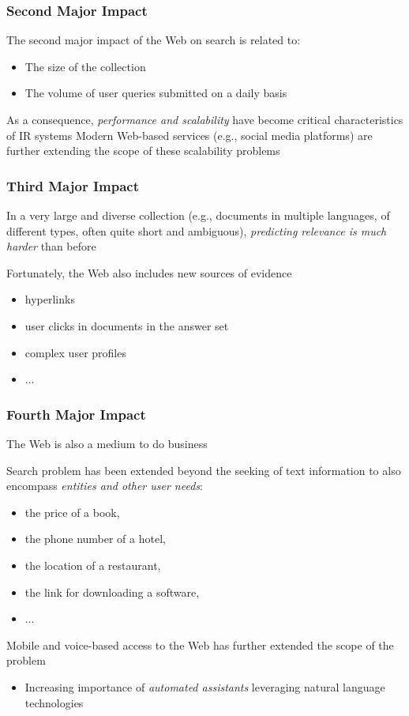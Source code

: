 \documentclass[svgnames]{beamer}
\begin{document}
\begin{frame}
    \frametitle{Second Major Impact}

    The second major impact of the Web on search is related to: 
    \begin{itemize}
    \item The size of the collection
    \item The volume of user queries submitted on a daily basis
    \end{itemize}

    As a consequence, \emph{performance and scalability} have become critical characteristics of IR systems
    \vfill
    Modern Web-based services (e.g., social media platforms) are further extending the scope of these scalability problems
\end{frame}

\begin{frame}
    \frametitle{Third Major Impact}

    In a very large and diverse collection (e.g., documents in multiple languages, of different types, often quite short and ambiguous), \emph{predicting relevance is much harder} than
    before
    \vfill

    Fortunately, the Web also includes new sources of evidence
    \begin{itemize} 
    \item hyperlinks 
    \item user clicks in documents in the answer set
    \item complex user profiles
    \item ...
    \end{itemize}
\end{frame}


\begin{frame}
    \frametitle{Fourth Major Impact}

    The Web is also a medium to do business
    \vfill

    Search problem has been extended beyond the seeking of text information to also encompass \emph{entities and other user needs}:
    \begin{itemize}
    \item the price of a book, 
    \item the phone number of a hotel,
    \item the location of a restaurant,
    \item the link for downloading a software,
    \item ...
    \end{itemize}
    \vfill
    Mobile and voice-based access to the Web has further extended the scope of the problem
    \begin{itemize}
    \item Increasing importance of \emph{automated assistants} leveraging natural language technologies
    \end{itemize}
\end{frame}
\end{document}
